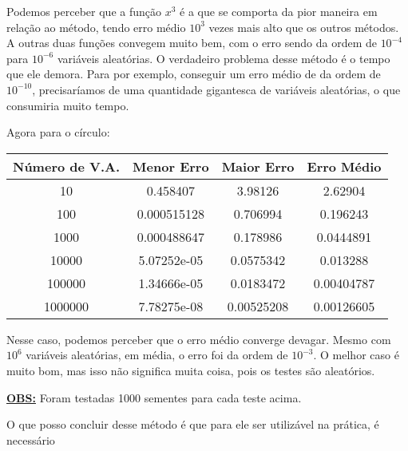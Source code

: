 \documentclass[12pt]{article}
\newcommand{\mytitle}[1]{\textbf{\underline{#1}}}
\begin{document}
Podemos perceber que a função $x^3$ é a que se comporta da pior maneira em relação ao método, tendo erro médio $10^3$ vezes mais alto que os outros métodos. A outras duas funções convegem muito bem, com o erro sendo da ordem de $10^{-4}$ para $10^{-6}$ variáveis aleatórias. O verdadeiro problema desse método é o tempo que ele demora. Para por exemplo, conseguir um erro médio de da ordem de $10^{-10}$, precisaríamos de uma quantidade gigantesca de variáveis aleatórias, o que consumiria muito tempo.

\newpage

Agora para o círculo:

\begin{center}
  \begin{tabular}{||c | c | c | c ||}
    \hline
    Número de V.A. & Menor Erro & Maior Erro & Erro Médio \\ [0.5ex]
    \hline\hline
    10 & 0.458407 & 3.98126 & 2.62904 \\
    \hline
    100 & 0.000515128 & 0.706994 & 0.196243 \\
    \hline
    1000 & 0.000488647 & 0.178986 & 0.0444891 \\
    \hline
    10000 & 5.07252e-05 & 0.0575342 & 0.013288 \\
    \hline
    100000 & 1.34666e-05 & 0.0183472 & 0.00404787 \\
    \hline
    1000000 & 7.78275e-08 & 0.00525208 & 0.00126605 \\
    \hline
  \end{tabular}
\end{center}

Nesse caso, podemos perceber que o erro médio converge devagar. Mesmo com $10^6$ variáveis aleatórias, em média, o erro foi da ordem de $10^{-3}$.
O melhor caso é muito bom, mas isso não significa muita coisa, pois os testes são aleatórios.

\mytitle{OBS:} Foram testadas 1000 sementes para cada teste acima.

O que posso concluir desse método é que para ele ser utilizável na prática, é necessário 
\end{document}
